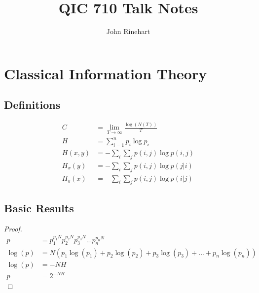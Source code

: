 \documentclass[a4paper,twoside,10pt]{report}
\begin{document}
\pagestyle{empty} %



\title{QIC 710 Talk Notes}
\author{John Rinehart}
\maketitle



\tableofcontents %
\cleardoublepage %

\pagestyle{plain} %







\chapter{Classical Information Theory}\label{CIT}

\section{Definitions}\label{def}
\begin{align}
C &= \lim_{T\rightarrow\infty} \frac{\log(N(T))}{T} \\ 
H &= \sum_{i=1}^n p_i\log{p_i} \\
H(x,y) &= -\sum_i\sum_j p(i,j)\log p(i,j)\\
H_x(y) &= -\sum_i\sum_j p(i,j)\log p(j|i) \\
H_y(x) &= -\sum_i\sum_j p(i,j)\log p(i|j) 
\end{align}

\section{Basic Results}
\begin{proof}
\begin{align} 
p &= p_1^{p_1N}p_2^{p_2N}p_3^{p_3N}...p_n^{p_nN} \\
\log(p) &= N(p_1\log(p_1)+p_2\log(p_2)+p_3\log(p_3)+...+p_n\log(p_n)) \\
\log(p) &= -NH \\ 
p &= 2^{-NH}
\end{align}
\end{proof}
\end{document}
